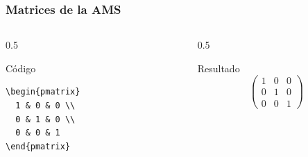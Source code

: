 \documentclass[12pt,aspectratio=169,ignorenonframetext]{ltxbeamer}
\begin{document}
\begin{frame}[fragile]
\frametitle{Matrices de la AMS}

\begin{columns}
    \begin{column}{0.5\textwidth}
        \begin{block}{Código}
\begin{verbatim}
\begin{pmatrix}
  1 & 0 & 0 \\
  0 & 1 & 0 \\
  0 & 0 & 1
\end{pmatrix}
\end{verbatim}
        \end{block}
    \end{column}

    \begin{column}{0.5\textwidth}
        \begin{exampleblock}{Resultado}
            \begin{equation*}
                \begin{pmatrix}
                    1 & 0 & 0 \\
                    0 & 1 & 0 \\
                    0 & 0 & 1
                \end{pmatrix}
            \end{equation*}
        \end{exampleblock}
    \end{column}
\end{columns}
\end{frame}
\end{document}
